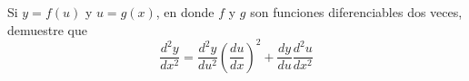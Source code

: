 \item Si $y = f(u)$ y $u = g(x)$, en donde $f$ y $g$ son funciones diferenciables dos veces, demuestre que
$$\frac{d^2y}{dx^2} = \frac{d^2y}{du^2} \left( \frac{du}{dx} \right)^2 + \frac{dy}{du} \frac{d^2u}{dx^2}$$
